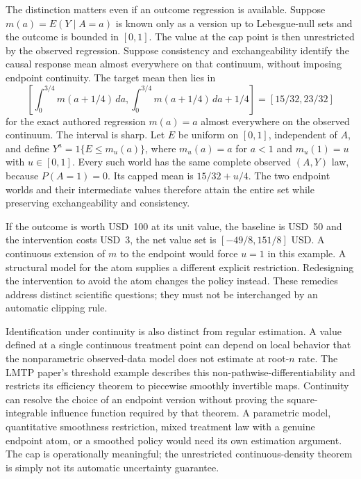 The distinction matters even if an outcome regression is available. Suppose
$m(a)=E(Y\mid A=a)$ is known only as a version up to Lebesgue-null sets and
the outcome is bounded in $[0,1]$. The value at the cap point is then
unrestricted by the observed regression. Suppose consistency and
exchangeability identify the causal response mean almost everywhere on that
continuum, without imposing endpoint continuity. The target mean then lies in
\begin{equation}
 \left[\int_0^{3/4}m(a+1/4)\,da,
       \int_0^{3/4}m(a+1/4)\,da+1/4\right]
 = [15/32,23/32]
 \label{exec17:s5-cap-set}
 \end{equation}
for the exact authored regression $m(a)=a$ almost everywhere on the observed
continuum. The interval is sharp. Let $E$ be uniform on $[0,1]$, independent
of $A$, and define $Y^a=1\{E\leq m_u(a)\}$, where $m_u(a)=a$ for $a<1$ and
$m_u(1)=u$ with $u\in[0,1]$. Every such world has the same complete
observed $(A,Y)$ law, because $P(A=1)=0$. Its capped mean is
$15/32+u/4$. The two endpoint worlds and their intermediate values therefore
attain the entire set while preserving exchangeability and consistency.

If the outcome is worth USD~100 at its unit value, the baseline is USD~50 and the
intervention costs USD~3, the net value set is
$[-49/8,151/8]$ USD. A continuous extension of $m$ to the endpoint would
force $u=1$ in this example. A structural model for the atom supplies a
different explicit restriction. Redesigning the intervention to avoid the
atom changes the policy instead. These remedies address distinct scientific
questions; they must not be interchanged by an automatic clipping rule.
\citep{lmtp2023,exec17_s5_math}

Identification under continuity is also distinct from regular estimation.
A value defined at a single continuous treatment point can depend on local
behavior that the nonparametric observed-data model does not estimate at
root-$n$ rate. The LMTP paper's threshold example describes this
non-pathwise-differentiability and restricts its efficiency theorem to
piecewise smoothly invertible maps. Continuity can resolve the choice of an
endpoint version without proving the square-integrable influence function
required by that theorem. A parametric model, quantitative smoothness
restriction, mixed treatment law with a genuine endpoint atom, or a smoothed
policy would need its own estimation argument. The cap is operationally
meaningful; the unrestricted continuous-density theorem is simply not its
automatic uncertainty guarantee.\citep{lmtp2023}

